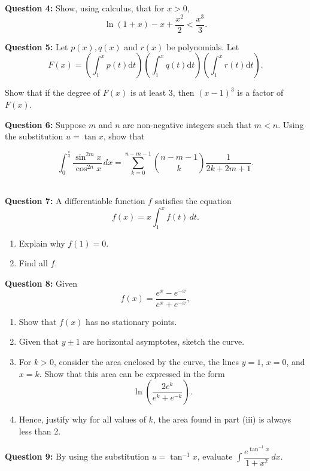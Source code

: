 \documentclass[oneside]{article}[14pt]
\begin{document}
\textbf{Question 4:}
Show, using calculus, that for $x>0$, $$\ln(1+x)-x+\dfrac{x^2}{2}<\dfrac{x^3}{3}.$$ \hfill {}
\vskip 8pt

\textbf{Question 5:}
Let $p(x), q(x)$ and $r(x)$ be polynomials. Let
\[ F(x) = \left( \int_1^x p(t)\mathrm dt\right) \left( \int_1^x q(t) \mathrm dt \right)\left(\int_1^x r(t) \mathrm dt\right).\]

Show that if the degree of $F(x)$ is at least 3, then $(x-1)^3$ is a factor of $F(x)$. \hfill {}
\vskip 8pt

\textbf{Question 6:}
Suppose $m$ and $n$ are non-negative integers such that $m < n$. Using the substitution $u = \tan x$, show that

\[
	\int_{0}^{\frac{\pi}{4}} \frac{\sin^{2m} x}{\cos^{2n} x} \,dx =
	\sum_{k=0}^{n-m-1} \binom{n-m-1}{k} \frac{1}{2k + 2m + 1}.
\]
\hfill {}
\newpage

\HRule \\
\vskip 4pt
\textbf{Question 7:}
A differentiable function $f$ satisfies the equation \[f(x)=x\int_1^x f(t)\,dt.\]

\begin{enumerate}
	\item[(i)] Explain why $f(1)=0$. \hfill {}
	\item[(ii)] Find all $f$. \hfill {}
\end{enumerate}
\vskip 8pt

\textbf{Question 8:}
Given \[f(x)=\dfrac{e^x-e^{-x}}{e^x+e^{-x}},\]
\begin{enumerate}
	\item[(i)] Show that $f(x)$ has no stationary points. \hfill {}
	\item[(ii)] Given that $y\pm 1$ are horizontal asymptotes, sketch the curve. \hfill {}
	\item[(iii)] For $k>0$, consider the area enclosed by the curve, the lines $y=1$, $x=0$, and $x=k$. Show that this area can be expressed in the form \[\ln\left(\dfrac{2e^k}{e^k+e^{-k}}\right).\] \hfill {}
	\item[(iv)] Hence, justify why for all values of $k$, the area found in part (iii) is always less than 2. \hfill {}
\end{enumerate}
\vskip 8pt

\textbf{Question 9:}
By using the substitution $u=\tan^{-1}x$, evaluate $\int\dfrac{e^{\tan^{-1}x}}{1+x^2}\,dx$. \hfill {}
\vskip 8pt
\end{document}
